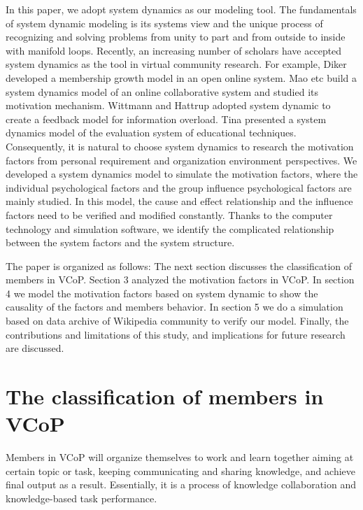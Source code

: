 \documentclass[doublespacing]{elsarticle}
\begin{document}
In this paper, we adopt system dynamics as our modeling
tool. The fundamentals of system dynamic modeling is its systems view
and the unique process of recognizing and  solving problems from
unity to part and from outside to inside with manifold
loops.  Recently, an increasing
number of scholars have accepted system dynamics as the tool in
virtual community research. For example, Diker  developed a
membership growth model in an open online system\cite{diker2004}. Mao etc build a system dynamics model of an online collaborative system and studied
its motivation mechanism\cite{4076734}. Wittmann and  Hattrup
adopted system dynamic to create a feedback model for information
overload\cite{wittmann_relationship_2004}. Tina presented a system dynamics model of
the evaluation system of educational techniques\cite{stavredes2001system}. Consequently, it is natural to choose system dynamics to
research the motivation factors from personal requirement and
organization environment perspectives. We developed a system dynamics
model to simulate the motivation factors, where the individual
psychological factors and the group influence psychological factors
are mainly studied. In this model, the cause and effect relationship
and the influence factors need to be verified and modified
constantly. Thanks to the computer technology and simulation software,
we identify the complicated relationship between the system factors
and the system structure. 
 
The paper is organized as follows: The next section discusses the
classification of members in VCoP. Section 3 analyzed the motivation factors
in VCoP. In section 4 we model the motivation factors based on system dynamic
to show the causality of the factors and members behavior. In section
5 we do a simulation based on data archive of Wikipedia community to verify our model.  Finally, the contributions and limitations of this study, and implications for future research are discussed.






\section{The classification of members in VCoP}
\label{sec:classification-uses}

Members in VCoP will organize themselves to work and learn together
aiming at certain topic or task, keeping  communicating and  sharing
knowledge, and achieve final output as a result. Essentially, it is a process of knowledge collaboration and knowledge-based task performance. 
\end{document}
